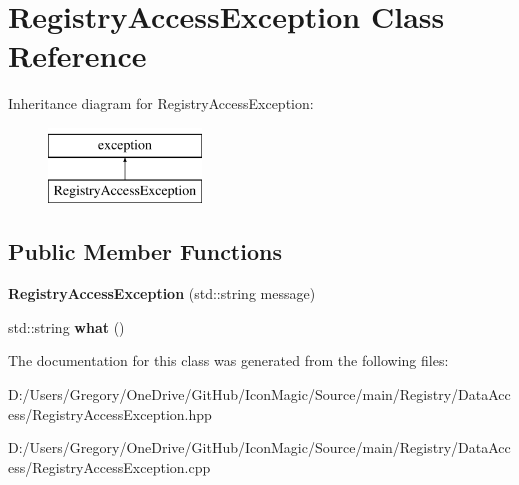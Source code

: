 \hypertarget{class_registry_access_exception}{}\section{Registry\+Access\+Exception Class Reference}
\label{class_registry_access_exception}
Inheritance diagram for Registry\+Access\+Exception\+:\begin{figure}[H]
\begin{center}
\leavevmode
\includegraphics[height=2.000000cm]{class_registry_access_exception}
\end{center}
\end{figure}
\subsection*{Public Member Functions}
\begin{DoxyCompactItemize}
\item 
\hypertarget{class_registry_access_exception_a1a85d7c94398af682f3b29a022cce704}{}{\bfseries Registry\+Access\+Exception} (std\+::string message)\label{class_registry_access_exception_a1a85d7c94398af682f3b29a022cce704}

\item 
\hypertarget{class_registry_access_exception_a4306a07dd787c0f82e215bd0cb061e09}{}std\+::string {\bfseries what} ()\label{class_registry_access_exception_a4306a07dd787c0f82e215bd0cb061e09}

\end{DoxyCompactItemize}


The documentation for this class was generated from the following files\+:\begin{DoxyCompactItemize}
\item 
D\+:/\+Users/\+Gregory/\+One\+Drive/\+Git\+Hub/\+Icon\+Magic/\+Source/main/\+Registry/\+Data\+Access/Registry\+Access\+Exception.\+hpp\item 
D\+:/\+Users/\+Gregory/\+One\+Drive/\+Git\+Hub/\+Icon\+Magic/\+Source/main/\+Registry/\+Data\+Access/Registry\+Access\+Exception.\+cpp\end{DoxyCompactItemize}
